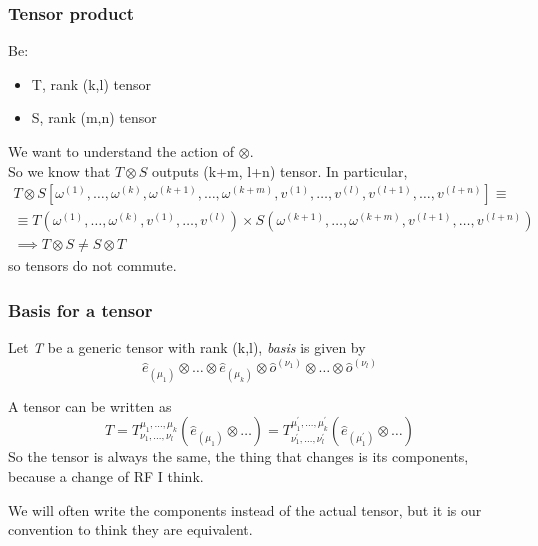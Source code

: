 \subsubsection{Tensor product}
Be:
\begin{itemize}
	\item T, rank (k,l) tensor
	\item S, rank (m,n) tensor
\end{itemize} 
We want to understand the action of $\otimes$. \\
So we know that $T\otimes S$ outputs (k+m, l+n) tensor. In particular,
\begin{gather*}
	T\otimes S \left[\omega^{\left( 1 \right)}, \ldots, \omega^{\left( k \right)}, \omega^{\left( k+1 \right)}, \ldots , \omega^{\left( k+m \right)}, v^{\left( 1 \right)}, \ldots , v^{\left( l \right)}, v^{\left( l+1 \right)}, \ldots , v^{\left( l+n \right)}\right] \equiv \\
	\equiv T\left( \omega^{\left( 1 \right)}, \ldots , \omega^{\left( k \right)}, v^{\left( 1 \right)}, \ldots , v^{\left( l \right)} \right) \times S\left( \omega^{\left( k+1 \right)}, \ldots , \omega^{\left( k+m \right)}, v^{\left( l+1 \right)}, \ldots , v^{\left( l+n \right)} \right) \\
	\implies T \otimes S \neq S \otimes T
\end{gather*}
so tensors do not commute.\par

\subsubsection{Basis for a tensor}
Let \emph{T} be a generic tensor with rank (k,l), \emph{basis} is given by
\[
\hat{e}_{\left( \mu_{1} \right)} \otimes \ldots \otimes \hat{e}_{( \mu_{k})} \otimes  \hat{o}^{\left( \nu_{1} \right)} \otimes \ldots \otimes \hat{o}^{(\nu_{l})}
\]

 A tensor can be written as 
 \[
 T = T^{\mu_{1}, \ldots , \mu_{k}}_{\nu_{1}, ..., \nu_{l}} \left( \hat{e}_{\left( \mu_{1} \right)} \otimes \ldots  \right) = T^{\mu_{1}^{'}, \ldots , \mu_{k}^{'}}_{\nu_{1}^{'}, \ldots , \nu _{l}^{'}}\left( \hat{e}_{\left( \mu_{1}^{'}  \right)} \otimes \ldots  \right)
 \]
So the tensor is always the same, the thing that changes is its components, because a change of RF I think.

We will often write the components instead of the actual tensor, but it is our convention to think they are equivalent.

